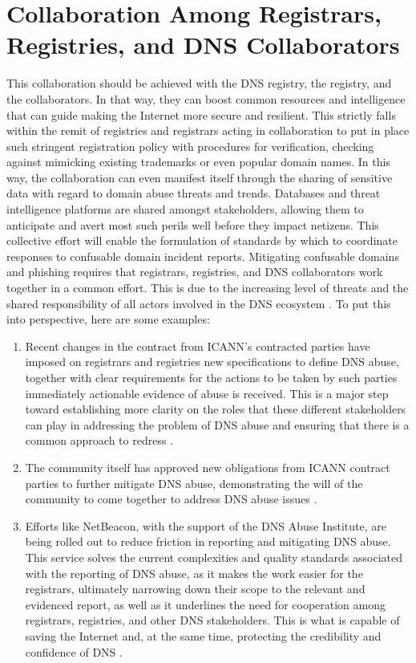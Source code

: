 \section{Collaboration Among Registrars, Registries, and DNS Collaborators}

This collaboration should be achieved with the DNS registry, the registry, and the collaborators. In that way, they can boost common resources and intelligence that can guide making the Internet more secure and resilient. This strictly falls within the remit of registries and registrars acting in collaboration to put in place such stringent registration policy with procedures for verification, checking against mimicking existing trademarks or even popular domain names. In this way, the collaboration can even manifest itself through the sharing of sensitive data with regard to domain abuse threats and trends. Databases and threat intelligence platforms are shared amongst stakeholders, allowing them to anticipate and avert most such perils well before they impact netizens. This collective effort will enable the formulation of standards by which to coordinate responses to confusable domain incident reports. Mitigating confusable domains and phishing requires that registrars, registries, and DNS collaborators work together in a common effort. This is due to the increasing level of threats and the shared responsibility of all actors involved in the DNS ecosystem \cite{Catania2022}. To put this into perspective, here are some examples: 


\begin{enumerate}
  \item Recent changes in the contract from ICANN's contracted parties have imposed on registrars and registries new specifications to define DNS abuse, together with clear requirements for the actions to be taken by such parties immediately actionable evidence of abuse is received. This is a major step toward establishing more clarity on the roles that these different stakeholders can play in addressing the problem of DNS abuse and ensuring that there is a common approach to redress \cite{Weinstein2023}.
  \item The community itself has approved new obligations from ICANN contract parties to further mitigate DNS abuse, demonstrating the will of the community to come together to address DNS abuse issues \cite{ICANN2023}.
  \item Efforts like NetBeacon, with the support of the DNS Abuse Institute, are being rolled out to reduce friction in reporting and mitigating DNS abuse. This service solves the current complexities and quality standards associated with the reporting of DNS abuse, as it makes the work easier for the registrars, ultimately narrowing down their scope to the relevant and evidenced report, as well as it underlines the need for cooperation among registrars, registries, and other DNS stakeholders. This is what is capable of saving the Internet and, at the same time, protecting the credibility and confidence of DNS \cite{NetBeacon}.
  
\end{enumerate}

